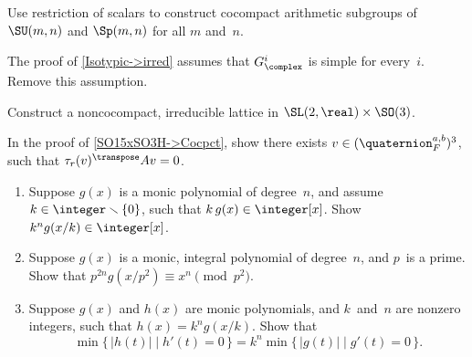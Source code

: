 \begin{exercises}

\item \label{CocpctSUSp}
 Use restriction of scalars to
construct cocompact arithmetic subgroups of  $\SU(m,n)$ and
$\Sp(m,n)$ for all $m$ and~$n$.

\item \label{Isotypic->irredNotAbsSimpleEx}
The proof of \cref{Isotypic->irred} assumes that $G^i_\complex$ is simple for every~$i$. Remove this assumption.

\item \label{CpctFactorNotCocpct}
 Construct a noncocompact, irreducible lattice in $\SL(2,\real)
\times \SO(3)$.

\item \label{NotCpct->UnipD}
In the proof of \cref{SO15xSO3H->Cocpct}, show there exists $v \in ( \quaternion^{a,b}_F )^3$, such that $\tau_r(v)^\transpose A v = 0$.

\item \label{rescalepoly}
 \begin{enumerate}
 \item Suppose $g(x)$ is a monic polynomial of degree~$n$,
and assume $k \in \integer \smallsetminus \{0\}$, such that $k \, g(x) \in
\integer[x]$. Show $k^n g(x/k) \in \integer[x]$.
 \item Suppose $g(x)$ is a monic, integral polynomial of
degree~$n$, and $p$~is a prime. Show that
 $p^{2n}g(x/p^2) \equiv x^n \pmod{p^2}$.
 \item Suppose $g(x)$ and $h(x)$ are monic polynomials, and
$k$~and~$n$ are nonzero integers, such that $h(x) =
k^ng(x/k)$. Show that
 $$\min \{\, |h(t)| \mid h'(t) = 0 \,\}
 = k^n \min \{\, |g(t)| \mid g'(t) = 0 \,\} .$$
 \end{enumerate}

 \end{exercises}














